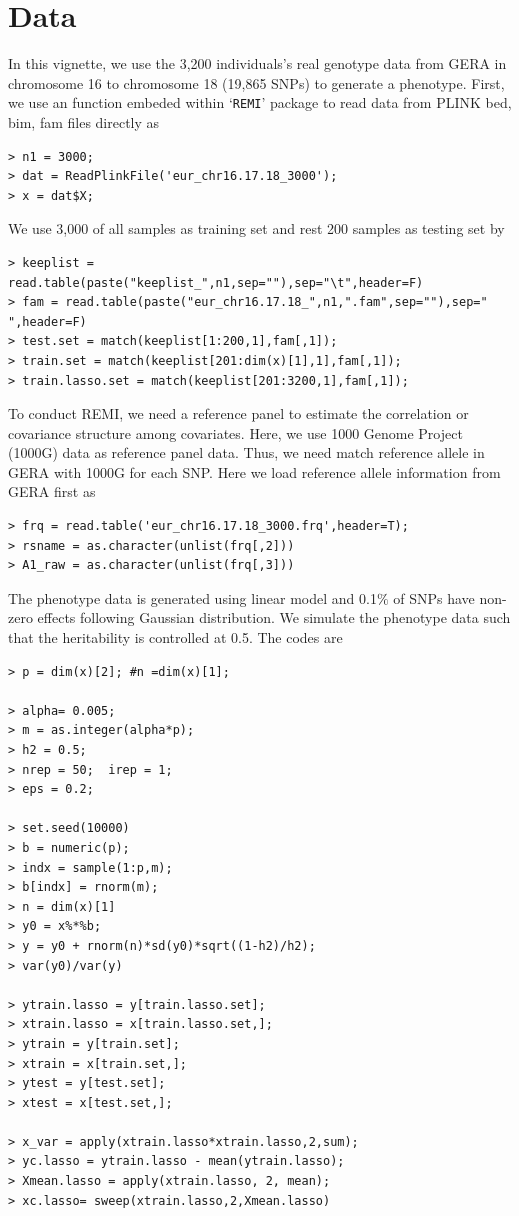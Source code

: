 \documentclass[11pt]{article}
\begin{document}
\section{Data}
\label{datagene}
In this vignette, we use the 3,200 individuals's real genotype data from GERA in chromosome 16 to chromosome 18 (19,865 SNPs) to generate a phenotype. First, we use an function embeded within `\texttt{REMI}' package to read data from PLINK bed, bim, fam files directly as
\begin{verbatim}
> n1 = 3000;
> dat = ReadPlinkFile('eur_chr16.17.18_3000');
> x = dat$X;
\end{verbatim}
We use 3,000 of all samples as training set and rest 200 samples as testing set by
\begin{verbatim}
> keeplist = read.table(paste("keeplist_",n1,sep=""),sep="\t",header=F)
> fam = read.table(paste("eur_chr16.17.18_",n1,".fam",sep=""),sep=" ",header=F)
> test.set = match(keeplist[1:200,1],fam[,1]);
> train.set = match(keeplist[201:dim(x)[1],1],fam[,1]);
> train.lasso.set = match(keeplist[201:3200,1],fam[,1]);
\end{verbatim}
To conduct REMI, we need a reference panel to estimate the correlation or covariance structure among covariates. Here, we use 1000 Genome Project (1000G) data as reference panel data. Thus, we need match reference allele in GERA with 1000G for each SNP. Here we load reference allele information from GERA first as
\begin{verbatim}
> frq = read.table('eur_chr16.17.18_3000.frq',header=T);
> rsname = as.character(unlist(frq[,2]))
> A1_raw = as.character(unlist(frq[,3]))
\end{verbatim}

The phenotype data is generated using linear model and 0.1$\%$ of SNPs have non-zero effects following Gaussian distribution. We simulate the phenotype data such that the heritability is controlled at 0.5. The codes are
\begin{verbatim}
> p = dim(x)[2]; #n =dim(x)[1];

> alpha= 0.005;
> m = as.integer(alpha*p);
> h2 = 0.5;
> nrep = 50;  irep = 1;
> eps = 0.2;

> set.seed(10000)
> b = numeric(p);
> indx = sample(1:p,m);
> b[indx] = rnorm(m);
> n = dim(x)[1]
> y0 = x%*%b;
> y = y0 + rnorm(n)*sd(y0)*sqrt((1-h2)/h2);
> var(y0)/var(y)

> ytrain.lasso = y[train.lasso.set];
> xtrain.lasso = x[train.lasso.set,];
> ytrain = y[train.set];
> xtrain = x[train.set,];
> ytest = y[test.set];
> xtest = x[test.set,];

> x_var = apply(xtrain.lasso*xtrain.lasso,2,sum);
> yc.lasso = ytrain.lasso - mean(ytrain.lasso);
> Xmean.lasso = apply(xtrain.lasso, 2, mean);
> xc.lasso= sweep(xtrain.lasso,2,Xmean.lasso)
\end{verbatim}
\end{document}
